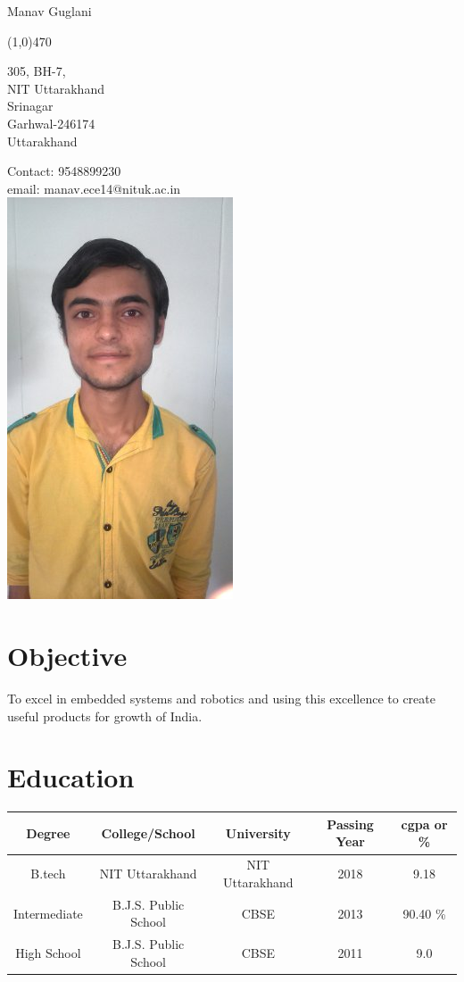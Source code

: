 \documentclass[11pt]{article}
\begin{document}
\centerline{\Large Manav Guglani} 
\noindent 
\line(1,0){470}
\\  
 \parbox[t]{5cm}
{305, BH-7,\\
	NIT Uttarakhand\\
	Srinagar \\
	Garhwal-246174\\
	Uttarakhand}
\hspace{7cm}
\parbox[t]{7cm}
{Contact: 9548899230\\
email:	manav.ece14@nituk.ac.in\\
	\vspace{1pt}
	\includegraphics[scale=.2]{manav.jpg}
}
\section*{Objective}
\large To excel in embedded systems and robotics and using this excellence to create useful products for growth of India. 
\section*{Education} 
\begin{tabular}{|c|c|c|c|c|}
	\hline
	Degree & College/School & University & Passing Year & cgpa or \% \\
	\hline
	B.tech & NIT Uttarakhand & NIT Uttarakhand & 2018 & 9.18\\
	\hline
	Intermediate & B.J.S. Public School & CBSE & 2013 & 90.40 \% \\
	\hline
	High School & B.J.S. Public School & CBSE & 2011 & 9.0 \\
	\hline
\end{tabular}
\end{document}

